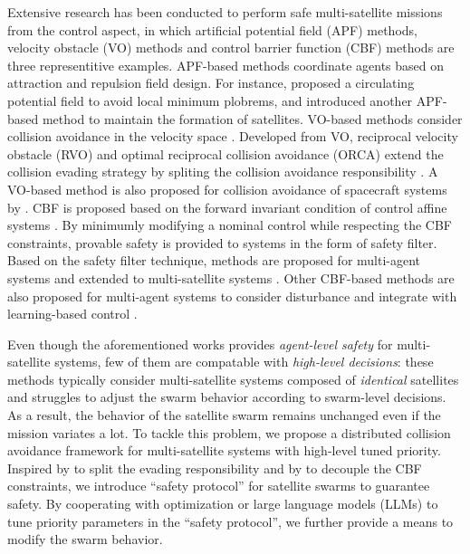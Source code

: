 \documentclass{ifacconf}
\begin{document}
\par Extensive research has been conducted to perform safe multi-satellite missions from the control aspect, in which artificial potential field (APF) methods, velocity obstacle (VO) methods and control barrier function (CBF) methods are three representitive examples.
APF-based methods coordinate agents based on attraction and repulsion field design. 
For instance, \cite{Hwang2022APF} proposed a circulating potential field to avoid local minimum plobrems, and \cite{Guan2024APF} introduced another APF-based method to maintain the formation of satellites. 
VO-based methods consider collision avoidance in the velocity space \cite[]{Douthwaite2019VO}. 
Developed from VO, reciprocal velocity obstacle (RVO) and optimal reciprocal collision avoidance (ORCA) extend the collision evading strategy by spliting the collision avoidance responsibility \cite[]{vanDenBerg2008RVO,Berg2011ORCA}.
A VO-based method is also proposed for collision avoidance of spacecraft systems by \cite[]{Li2025ELVO}.
CBF is proposed based on the forward invariant condition of control affine systems \cite[]{XXX}. 
By minimumly modifying a nominal control while respecting the CBF constraints, provable safety is provided to systems in the form of safety filter.
Based on the safety filter technique, methods are proposed for multi-agent systems \cite[]{Borrmann2015CBFswarm} and extended to multi-satellite systems \cite[]{Hibbard2022CBFspacecraft}. Other CBF-based methods are also proposed for multi-agent systems to consider disturbance \cite[]{Cheng2020CBFDisturbance} and integrate with learning-based control \cite[]{Liu2024RLFlocking}.

\par Even though the aforementioned works provides \textit{agent-level safety} for multi-satellite systems, few of them are compatable with \textit{high-level decisions}:
these methods typically consider multi-satellite systems composed of \textit{identical} satellites and struggles to adjust the swarm behavior according to swarm-level decisions.
As a result, the behavior of the satellite swarm remains unchanged even if the mission variates a lot.
To tackle this problem, we propose a distributed collision avoidance framework for multi-satellite systems with high-level tuned priority.
Inspired by \cite{Berg2011ORCA} to split the evading responsibility and by \cite{Chen2021Backup} to decouple the CBF constraints, we introduce ``safety protocol'' for satellite swarms to guarantee safety. 
By cooperating with optimization or large language models (LLMs) to tune priority parameters in the ``safety protocol'', we further provide a means to modify the swarm behavior.
\end{document}
